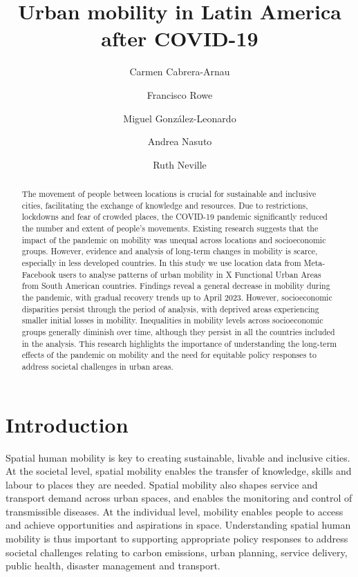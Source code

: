 \documentclass[
  11pt,
]{article}
\title{\textbf{Urban mobility in Latin America after COVID-19}}
\author[1]{Carmen Cabrera-Arnau}
\author[1]{Francisco Rowe}
\author[2]{Miguel González-Leonardo}
\author[1]{Andrea Nasuto}
\author[1]{Ruth Neville}
\affil[1]{Geographic Data Science Lab, Department of Geography and
Planning, University of Liverpool, Liverpool, UK}
\affil[2]{Centre for Demographic Urban and Environmental Studies, El
Colegio de México, Ciudad de México, México}
\date{}
\begin{document}
\maketitle
\begin{abstract}
The movement of people between locations is crucial for sustainable and
inclusive cities, facilitating the exchange of knowledge and resources.
Due to restrictions, lockdowns and fear of crowded places, the COVID-19
pandemic significantly reduced the number and extent of people's
movements. Existing research suggests that the impact of the pandemic on
mobility was unequal across locations and socioeconomic groups. However,
evidence and analysis of long-term changes in mobility is scarce,
especially in less developed countries. In this study we use location
data from Meta-Facebook users to analyse patterns of urban mobility in X
Functional Urban Areas from South American countries. Findings reveal a
general decrease in mobility during the pandemic, with gradual recovery
trends up to April 2023. However, socioeconomic disparities persist
through the period of analysis, with deprived areas experiencing smaller
initial losses in mobility. Inequalities in mobility levels across
socioeconomic groups generally diminish over time, although they persist
in all the countries included in the analysis. This research highlights
the importance of understanding the long-term effects of the pandemic on
mobility and the need for equitable policy responses to address societal
challenges in urban areas.
\end{abstract}
\ifdefined\Shaded\renewenvironment{Shaded}{\begin{tcolorbox}[borderline west={3pt}{0pt}{shadecolor}, enhanced, breakable, boxrule=0pt, sharp corners, frame hidden, interior hidden]}{\end{tcolorbox}}\fi

\hypertarget{sec-intro}{%
\section{Introduction}\label{sec-intro}}

Spatial human mobility is key to creating sustainable, livable and
inclusive cities. At the societal level, spatial mobility enables the
transfer of knowledge, skills and labour to places they are needed.
Spatial mobility also shapes service and transport demand across urban
spaces, and enables the monitoring and control of transmissible
diseases. At the individual level, mobility enables people to access and
achieve opportunities and aspirations in space. Understanding spatial
human mobility is thus important to supporting appropriate policy
responses to address societal challenges relating to carbon emissions,
urban planning, service delivery, public health, disaster management and
transport.
\end{document}
